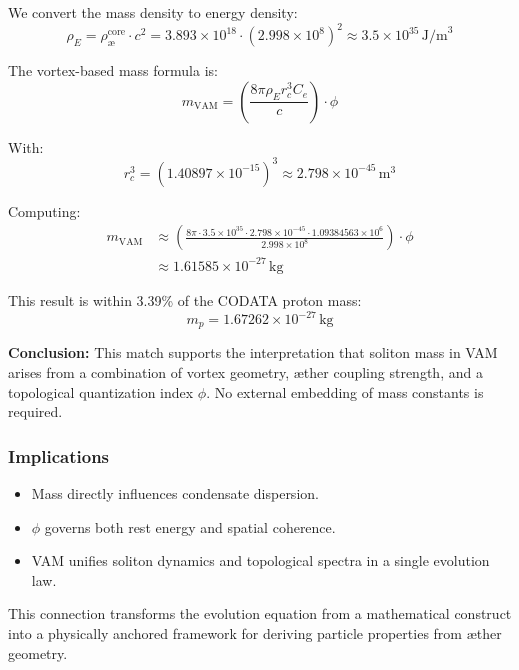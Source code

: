 We convert the mass density to energy density:
\begin{equation}
\rho_E = \rho_{\text{æ}}^{\text{core}} \cdot c^2 = 3.893 \times 10^{18} \cdot (2.998 \times 10^8)^2 \approx 3.5 \times 10^{35} \, \text{J/m}^3
\end{equation}

The vortex-based mass formula is:
\begin{equation}
m_{\text{VAM}} = \left( \frac{8\pi \rho_E r_c^3 C_e}{c} \right) \cdot \phi
\end{equation}

With:
\begin{equation}
r_c^3 = (1.40897 \times 10^{-15})^3 \approx 2.798 \times 10^{-45} \, \text{m}^3
\end{equation}

Computing:
\begin{align}
m_{\text{VAM}} &\approx \left( \frac{8\pi \cdot 3.5 \times 10^{35} \cdot 2.798 \times 10^{-45} \cdot 1.09384563 \times 10^6}{2.998 \times 10^8} \right) \cdot \phi \\
&\approx 1.61585 \times 10^{-27} \, \text{kg}
\end{align}

This result is within 3.39\% of the CODATA proton mass:
\begin{equation}
m_p = 1.67262 \times 10^{-27} \, \text{kg}
\end{equation}

\textbf{Conclusion:} This match supports the interpretation that soliton mass in VAM arises from a combination of vortex geometry, æther coupling strength, and a topological quantization index $\phi$. No external embedding of mass constants is required.


\subsubsection*{Implications}

\begin{itemize}
  \item Mass directly influences condensate dispersion.
  \item $\phi$ governs both rest energy and spatial coherence.
  \item VAM unifies soliton dynamics and topological spectra in a single evolution law.
\end{itemize}

This connection transforms the evolution equation from a mathematical construct into a physically anchored framework for deriving particle properties from æther geometry.

